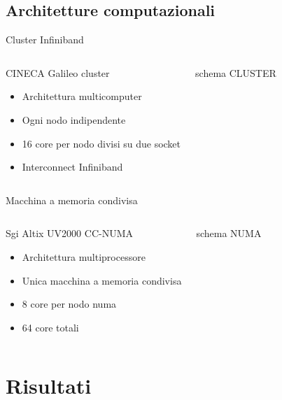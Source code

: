 \documentclass[8pt]{beamer}
\begin{document}
\subsection{Architetture computazionali}
\begin{frame}{Cluster Infiniband}

\begin{columns}
	\begin{block}{CINECA Galileo cluster}
		\begin{itemize}
			\item Architettura multicomputer
			\item Ogni nodo indipendente
			\item 16 core per nodo divisi su due socket
			\item Interconnect Infiniband
		\end{itemize}
	\end{block}

			\begin{center}
				schema CLUSTER
			\end{center}
\end{columns}

\end{frame}

\begin{frame}{Macchina a memoria condivisa}
\begin{columns}
	\begin{block}{Sgi Altix UV2000 CC-NUMA}
		\begin{itemize}
			\item Architettura multiprocessore
			\item Unica macchina a memoria condivisa
			\item 8 core per nodo numa
			\item 64 core totali
		\end{itemize}
	\end{block}
	
	\begin{center}
		schema NUMA
	\end{center}
	
\end{columns}

\end{frame}



\section{Risultati}
\end{document}
